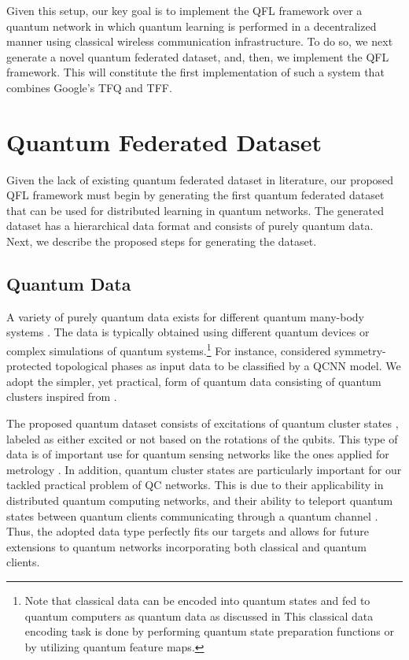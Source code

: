 \documentclass{article}
\begin{document}
Given this setup, our key goal is to implement the QFL framework over a quantum network in which quantum learning is performed in a decentralized manner using classical wireless communication infrastructure. To do so, we next generate a novel quantum federated dataset, and, then, we implement the QFL framework. This will constitute the first implementation of such a system that combines Google's TFQ and TFF.
\section{Quantum Federated Dataset}
\label{data_section}
Given the lack of existing quantum federated dataset in literature, our proposed QFL framework must begin by generating the first quantum federated dataset that can be used for distributed learning in quantum networks. The generated dataset has a hierarchical data format and consists of purely quantum data. Next, we describe the proposed steps for generating the dataset.
\subsection{Quantum Data}
A variety of purely quantum data exists for different quantum many-body systems \cite{quantum_many_body_systems}. The data is typically obtained using different quantum devices or complex simulations of quantum systems.\footnote{Note that classical data can be encoded into quantum states and fed to quantum computers as quantum data as discussed in \cite{effect_data_encoding_variational_QML} This classical data encoding task is done by performing quantum state preparation functions or by utilizing quantum feature maps.} For instance, \cite{Cong2019_QCNN} considered symmetry-protected topological phases \cite{Gu_2009_SPT1,Schuch_2011_SPT2} as input data to be classified by a QCNN model. We adopt the simpler, yet practical, form of quantum data consisting of quantum clusters inspired from \cite{TFQ_qcnn}.  %

The proposed quantum dataset consists of excitations of quantum cluster states \cite{Nielsen_2006_cluster_states_quantum_computation,Briegel2009_cluster_states}, labeled as either excited or not based on the rotations of the qubits. This type of data is of important use for quantum sensing networks like the ones applied for metrology \cite{Friis_2017_cluster_states_metrology}. In addition, quantum cluster states are particularly important for our tackled practical problem of QC networks. This is due to their applicability in distributed quantum computing networks, and their ability to teleport quantum states between quantum clients communicating through a quantum channel \cite{cluster_states_communications}. Thus, the adopted data type perfectly fits our targets and allows for future extensions to quantum networks incorporating both classical and quantum clients.
\end{document}
